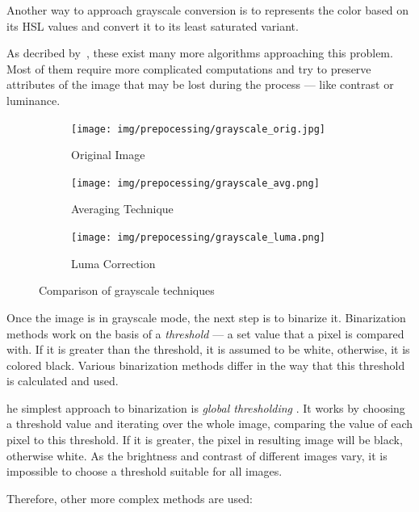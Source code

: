Another way to approach grayscale conversion is to represents the color based on its HSL values and convert it to its least saturated variant.

As decribed by~\citet{grayscaleCadik}, these exist many more algorithms approaching this problem. Most of them require more complicated computations and try to preserve attributes of the image that may be lost during the process --- like contrast or luminance.

\begin{figure}[H]
\hspace*{\fill} %
\begin{subfigure}{0.31\textwidth}
\texttt{[image: img/prepocessing/grayscale\_orig.jpg]}
\caption{Original Image} \label{fig:1a}
\end{subfigure}
\hspace*{\fill} %
\begin{subfigure}{0.31\textwidth}
\texttt{[image: img/prepocessing/grayscale\_avg.png]}
\caption{Averaging Technique} \label{fig:1b}
\end{subfigure}
\hspace*{\fill} %
\begin{subfigure}{0.31\textwidth}
\texttt{[image: img/prepocessing/grayscale\_luma.png]}
\caption{Luma Correction}\label{fig:1c}
\end{subfigure}
\caption{Comparison of grayscale techniques} \label{fig:1}
\end{figure}

Once the image is in grayscale mode, the next step is to binarize it. Binarization methods work on the basis of a \emph{threshold} --- a set value that a pixel is compared with. If it is greater than the threshold, it is assumed to be white, otherwise, it is colored black. Various binarization methods differ in the way that this threshold is calculated and used.

he simplest approach to binarization is \emph{global thresholding} \citep{globalThresh}. It works by choosing a threshold value and iterating over the whole image, comparing the value of each pixel to this threshold. If it is greater, the pixel in resulting image will be black, otherwise white. As the brightness and contrast of different images vary, it is impossible to choose a threshold suitable for all images.

Therefore, other more complex methods are used:

